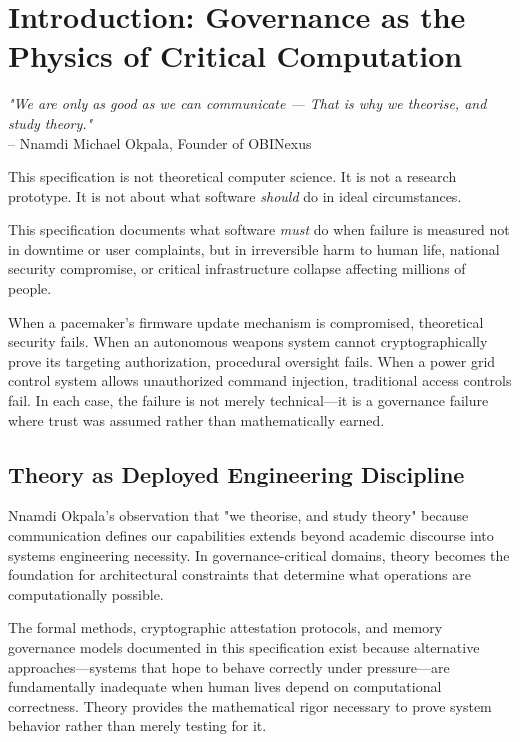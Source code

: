 \chapter*{Introduction: Governance as the Physics of Critical Computation}

\begin{flushright}
\textit{"We are only as good as we can communicate — That is why we theorise, and study theory."} \\
– Nnamdi Michael Okpala, Founder of OBINexus
\end{flushright}

\vspace{1em}

This specification is not theoretical computer science. It is not a research prototype. It is not about what software \textit{should} do in ideal circumstances.

This specification documents what software \textit{must} do when failure is measured not in downtime or user complaints, but in irreversible harm to human life, national security compromise, or critical infrastructure collapse affecting millions of people.

When a pacemaker's firmware update mechanism is compromised, theoretical security fails. When an autonomous weapons system cannot cryptographically prove its targeting authorization, procedural oversight fails. When a power grid control system allows unauthorized command injection, traditional access controls fail. In each case, the failure is not merely technical—it is a governance failure where trust was assumed rather than mathematically earned.

\section*{Theory as Deployed Engineering Discipline}

Nnamdi Okpala's observation that "we theorise, and study theory" because communication defines our capabilities extends beyond academic discourse into systems engineering necessity. In governance-critical domains, theory becomes the foundation for architectural constraints that determine what operations are computationally possible.

The formal methods, cryptographic attestation protocols, and memory governance models documented in this specification exist because alternative approaches—systems that hope to behave correctly under pressure—are fundamentally inadequate when human lives depend on computational correctness. Theory provides the mathematical rigor necessary to prove system behavior rather than merely testing for it.

